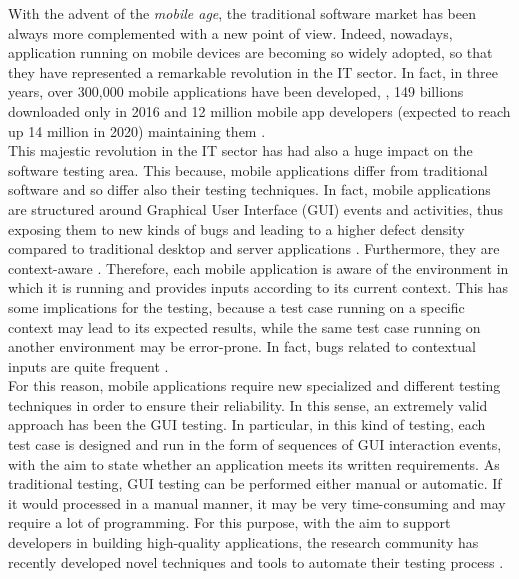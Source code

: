 With the advent of the \textit{mobile age}, the traditional software market has been always more complemented with a new point of view. Indeed, nowadays, application running on mobile devices are becoming so widely adopted, so that they have represented a remarkable revolution in the IT sector. In fact, in three years, over 300,000 mobile applications have been developed, \cite{muccini}, 149 billions downloaded only in 2016 \cite{statista} and 12 million mobile app developers (expected to reach up 14 million in 2020) maintaining them \cite{DevRelate}. \\
This majestic revolution in the IT sector has had also a huge impact on the software testing area. This because, mobile applications differ from traditional software and so differ also their testing techniques. 
In fact, mobile applications are structured around Graphical User Interface (GUI) events and activities, thus exposing them to new kinds of bugs and leading to a higher defect density compared to traditional desktop and server applications \cite{Hu:2011:AGT:1982595.1982612}. Furthermore, they are context-aware \cite{muccini}. 
Therefore, each mobile application is aware of the environment in which it is running and provides inputs according to its current context. This has some implications for the testing, because a test case running on a specific context may lead to its expected results, while the same test case running on another environment may be error-prone. In fact, bugs related to contextual inputs are quite frequent \cite{muccini}. \\
For this reason, mobile applications require new specialized and different testing techniques \cite{muccini} in order to ensure their reliability. In this sense, an extremely valid approach has been the GUI testing. In particular, in this kind of testing, each test case is designed and run in the form of sequences of GUI interaction events, with the aim to state whether an application meets its written requirements. 
As traditional testing, GUI testing can be performed either manual or automatic. If it would processed in a manual manner, it may be very time-consuming and may require a lot of programming.  
For this purpose, with the aim to support developers in building high-quality applications, the research community has recently developed novel techniques and tools to automate their testing process \cite{sapienz, dynodroid ,muccini,Hu:2011:AGT:1982595.1982612}. \\
